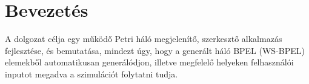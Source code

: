 

\chapter{Bevezetés}
A dolgozat célja egy működő Petri háló  megjelenítő, szerkesztő alkalmazás fejlesztése, és bemutatása, mindezt úgy, hogy a generált háló BPEL (WS-BPEL) elemekből automatikusan generálódjon, illetve megfelelő helyeken felhasználói inputot megadva a szimulációt folytatni tudja.  
